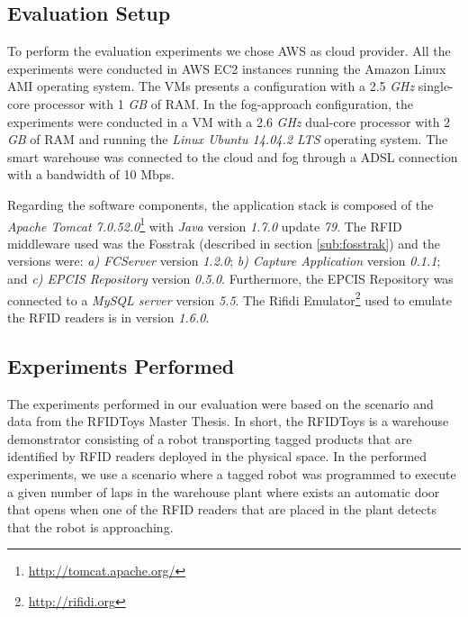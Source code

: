 \subsection{Evaluation Setup}
\label{sub:eval_setup}
To perform the evaluation experiments we chose \gls{AWS} as cloud provider. All the experiments were
conducted in \gls{AWS} \gls{EC2} instances running the Amazon Linux \gls{AMI} operating system. The \glspl{VM}
presents a configuration with a 2.5 \textit{\gls{GHz}} single-core processor with 1 \textit{\gls{GB}} of
\gls{RAM}. In the fog-approach configuration, the experiments were conducted in a \gls{VM} with
a 2.6 \textit{\gls{GHz}} dual-core processor with 2 \textit{\gls{GB}} of \gls{RAM} and running
the \textit{Linux Ubuntu 14.04.2 LTS} operating system. The smart warehouse was connected to the cloud
and fog through a \gls{ADSL} connection with a bandwidth of 10 Mbps.

Regarding the software components, the application stack is composed of the \textit{Apache Tomcat 7.0.52.0}\footnote{\url{http://tomcat.apache.org/}}
with \textit{Java} version \textit{1.7.0} update \textit{79}. The \gls{RFID} middleware used was the Fosstrak
(described in section \ref{sub:fosstrak}) and the versions were: \textit{a) \gls{FCServer}} version
\textit{1.2.0}; \textit{b) Capture Application} version \textit{0.1.1}; and \textit{c) \gls{EPCIS} Repository}
version \textit{0.5.0}. Furthermore, the \gls{EPCIS} Repository was connected to a \textit{MySQL server}
version \textit{5.5}. The Rifidi Emulator\footnote{\url{http://rifidi.org}} used to emulate the \gls{RFID}
readers is in version \textit{1.6.0}.

\subsection{Experiments Performed}
\label{sub:eval_experiments}
The experiments performed in our evaluation were based on the scenario and data from the RFIDToys \cite{Correia:Thesis:2014}
Master Thesis. In short, the RFIDToys is a warehouse demonstrator consisting of a robot transporting
tagged products that are identified by RFID readers deployed in the physical space. In the
performed experiments, we use a scenario where a tagged robot was programmed to execute
a given number of laps in the warehouse plant where exists an automatic door that
opens when one of the RFID readers that are placed in the plant detects that the robot is
approaching.

